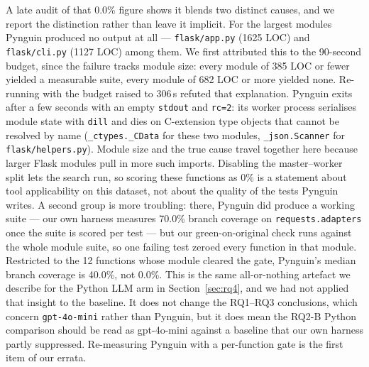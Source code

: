 A late audit of that 0.0\% figure shows it blends two distinct causes, and we report the
distinction rather than leave it implicit. For the largest modules Pynguin produced no
output at all --- \texttt{flask/app.py} (1625 LOC) and \texttt{flask/cli.py} (1127 LOC)
among them. We first attributed this to the 90-second budget, since the failure tracks
module size: every module of 385 LOC or fewer yielded a measurable suite, every module of
682 LOC or more yielded none. Re-running with the budget raised to 306\,s refuted that
explanation. Pynguin exits after a few seconds with an empty \texttt{stdout} and
\texttt{rc=2}: its worker process serialises module state with \texttt{dill} and dies on
C-extension type objects that cannot be resolved by name (\texttt{\_ctypes.\_CData} for
these two modules, \texttt{\_json.Scanner} for \texttt{flask/helpers.py}). Module size and
the true cause travel together here because larger Flask modules pull in more such
imports. Disabling the master--worker split lets the search run, so scoring these
functions as 0\% is a statement about tool applicability on this dataset, not about the
quality of the tests Pynguin writes. A second group is more troubling: there, Pynguin did
produce a working suite --- our own harness measures 70.0\% branch coverage on
\texttt{requests.adapters} once the suite is scored per test --- but our
green-on-original check runs against the whole module suite, so one failing test zeroed
every function in that module. Restricted to the 12 functions whose module cleared the
gate, Pynguin's median branch coverage is 40.0\%, not 0.0\%. This is the same
all-or-nothing artefact we describe for the Python LLM arm in Section~\ref{sec:rq4}, and
we had not applied that insight to the baseline. It does not change the RQ1--RQ3
conclusions, which concern \texttt{gpt-4o-mini} rather than Pynguin, but it does mean the
RQ2-B Python comparison should be read as gpt-4o-mini against a baseline that our own
harness partly suppressed. Re-measuring Pynguin with a per-function gate is the first item
of our errata.
